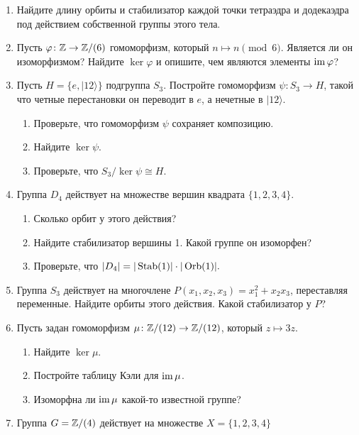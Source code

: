 \begin{enumerate}
    \item Найдите длину орбиты и стабилизатор каждой точки тетраэдра и додекаэдра под действием собственной группы этого тела. 
    \item Пусть $\varphi \colon \mathbb Z \to \mathbb Z/(6)$ гомоморфизм, который $n \mapsto n \pmod 6.$
            Является ли он изоморфизмом? Найдите $\ker \varphi$ и опишите, 
            чем являются элементы $\operatorname{im} \varphi$?
    \item Пусть $H = \{e, |1 2\rangle \}$ подгруппа $S_3$. Постройте гомоморфизм
         $\psi \colon S_3 \to H$, такой что четные перестановки он переводит в  $e$,
         а нечетные в $|1 2 \rangle$. 
         \begin{enumerate}
             \item Проверьте, что гомоморфизм $\psi$ сохраняет композицию.
             \item Найдите $\ker \psi$.
             \item Проверьте, что $S_3/\ker\psi \cong H$.
         \end{enumerate}
     \item Группа $D_4$ действует на множестве вершин квадрата $\{1, 2, 3, 4\}$.
         \begin{enumerate}
             \item Сколько орбит у этого действия?
             \item Найдите стабилизатор вершины 1. Какой группе он изоморфен?
             \item Проверьте, что \(
             |D_4| = |\operatorname{Stab}(1)| \cdot |\operatorname{Orb}(1)|
             .\)
         \end{enumerate}
    \item Группа $S_3$ действует на многочлене $P(x_1, x_2, x_3) = x_1^2 + x_2x_3$,
        переставляя переменные. Найдите орбиты этого действия. Какой стабилизатор у $P$?
    \item Пусть задан гомоморфизм $\mu \colon \mathbb Z/(12) \to \mathbb Z/(12)$, который $z \mapsto 3z$.
        \begin{enumerate}
            \item Найдите $\ker \mu$.
            \item Постройте таблицу Кэли для $\operatorname{im} \mu$.
            \item Изоморфна ли $\operatorname{im} \mu$ какой-то известной группе?
        \end{enumerate}
    \item Группа $G = \mathbb Z / (4)$ действует на множестве $X = \{1, 2, 3, 4\}$ 

\end{enumerate}
